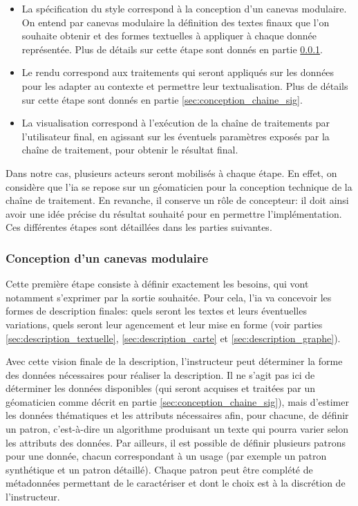 \begin{itemize}
    \item La spécification du style correspond à la conception d'un canevas modulaire. On entend par canevas modulaire la définition des textes finaux que l'on souhaite obtenir et des formes textuelles à appliquer à chaque donnée représentée. Plus de détails sur cette étape sont donnés en partie \ref{sec:conception_canevas}.
    \item Le rendu correspond aux traitements qui seront appliqués sur les données pour les adapter au contexte et permettre leur textualisation. Plus de détails sur cette étape sont donnés en partie \ref{sec:conception_chaine_sig}.
    \item La visualisation correspond à l’exécution de la chaîne de traitements par l'utilisateur final, en agissant sur les éventuels paramètres exposés par la chaîne de traitement,  pour obtenir le résultat final.
\end{itemize}

\newpar{}

Dans notre cas, plusieurs acteurs seront mobilisés à chaque étape. En effet, on considère que l’\gls{ia} se repose sur un géomaticien pour la conception technique de la chaîne de traitement. En revanche, il conserve un rôle de concepteur: il doit ainsi avoir une idée précise du résultat souhaité pour en permettre l’implémentation. Ces différentes étapes sont détaillées dans les parties suivantes.

\subsubsection{Conception d'un canevas modulaire}

\label{sec:conception_canevas}

Cette première étape consiste à définir exactement les besoins, qui vont notamment s’exprimer par la sortie souhaitée. Pour cela, l’\gls{ia} va concevoir les formes de description finales: quels seront les textes et leurs éventuelles variations, quels seront leur agencement et leur mise en forme (voir parties \ref{sec:description_textuelle}, \ref{sec:description_carte} et \ref{sec:description_graphe}).

\newpar{}

Avec cette vision finale de la description, l’instructeur peut déterminer la forme des données nécessaires pour réaliser la description. Il ne s’agit pas ici de déterminer les données disponibles (qui seront acquises et traitées par un géomaticien comme décrit en partie \ref{sec:conception_chaine_sig}), mais d’estimer les données thématiques et les attributs nécessaires afin, pour chacune, de définir un patron, c’est-à-dire un algorithme produisant un texte qui pourra varier selon les attributs des données. Par ailleurs, il est possible de définir plusieurs patrons pour une donnée, chacun correspondant à un usage (par exemple un patron synthétique et un patron détaillé). Chaque patron peut être complété de métadonnées permettant de le caractériser et dont le choix est à la discrétion de l’instructeur.

